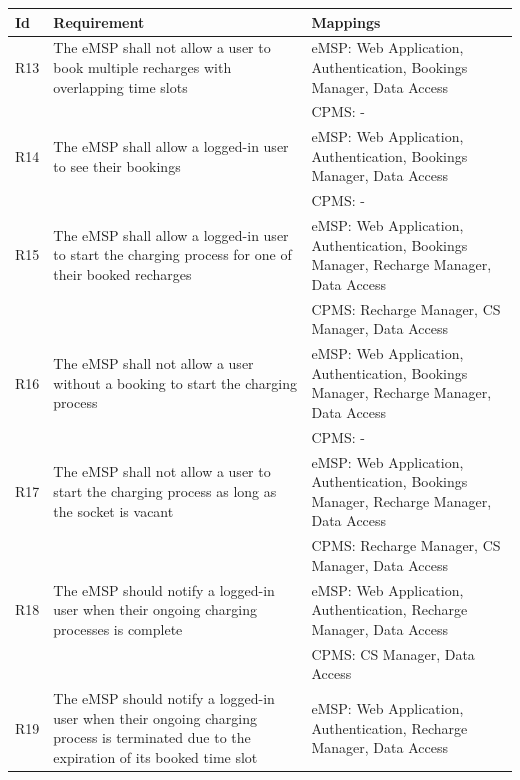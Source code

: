 \documentclass[11pt]{article}
\begin{document}
\begin{table}[H]
    \centering
    \setlength{\tabcolsep}{18pt}
    \renewcommand{\arraystretch}{1.2}
    \begin{tabularx}{\textwidth}{|>{\centering\hsize=0.15\hsize}X|>{\hsize=1.425\hsize}X|>{\hsize=1.425\hsize}X|}
        \hline
        \textbf{Id} & \textbf{Requirement} & \textbf{Mappings} \\
        \hline
        R13 & The eMSP shall not allow a user to book multiple recharges with overlapping time slots & eMSP: Web Application, Authentication, Bookings Manager, Data Access \\
        & & CPMS: - \\
        \hline
        R14 & The eMSP shall allow a logged-in user to see their bookings & eMSP: Web Application, Authentication, Bookings Manager, Data Access \\
        & & CPMS: - \\
        \hline
        R15 & The eMSP shall allow a logged-in user to start the charging process for one of their booked recharges & eMSP: Web Application, Authentication, Bookings Manager, Recharge Manager, Data Access \\
        & & CPMS: Recharge Manager, CS Manager, Data Access \\
        \hline
        R16 & The eMSP shall not allow a user without a booking to start the charging process & eMSP: Web Application, Authentication, Bookings Manager, Recharge Manager, Data Access \\
        & & CPMS: - \\
        \hline
        R17 & The eMSP shall not allow a user to start the charging process as long as the socket is vacant & eMSP: Web Application, Authentication, Bookings Manager, Recharge Manager, Data Access \\
        & & CPMS: Recharge Manager, CS Manager, Data Access \\
        \hline
        R18 & The eMSP should notify a logged-in user when their ongoing charging processes is complete & eMSP: Web Application, Authentication, Recharge Manager, Data Access \\
        & & CPMS: CS Manager, Data Access \\
        \hline
        R19 & The eMSP should notify a logged-in user when their ongoing charging process is terminated due to the expiration of its booked time slot & eMSP: Web Application, Authentication, Recharge Manager, Data Access \\

\end{tabularx}
\end{table}
\end{document}

